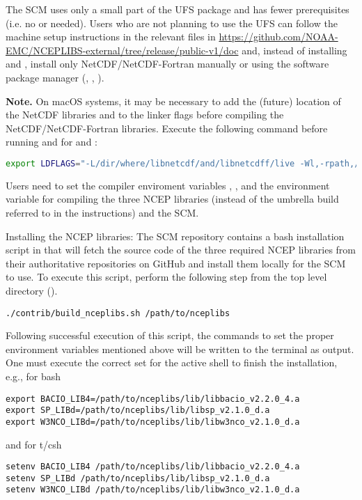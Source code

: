 The SCM uses only a small part of the UFS  package and has fewer prerequisites (i.e. no  or  needed). Users who are not planning to use the UFS can follow the machine setup instructions in the relevant  files in \url{https://github.com/NOAA-EMC/NCEPLIBS-external/tree/release/public-v1/doc} and, instead of installing  and , install only NetCDF/NetCDF-Fortran manually or using the software package manager (, , ).

\textbf{Note.} On macOS systems, it may be necessary to add the (future) location of the NetCDF libraries  and  to the  linker flags before compiling the NetCDF/NetCDF-Fortran libraries. Execute the following command before running  and  for  and :
\begin{lstlisting}[language=bash]
export LDFLAGS="-L/dir/where/libnetcdf/and/libnetcdff/live -Wl,-rpath,/dir/where/libnetcdf/and/libnetcdff/live"
\end{lstlisting}

Users need to set the compiler enviroment variables ,  ,  and the environment variable  for compiling the three NCEP libraries (instead of the  umbrella build referred to in the  instructions) and the SCM.

Installing the NCEP libraries: The SCM repository contains a bash installation script in  that will fetch the source code of the three required NCEP libraries from their authoritative repositories on GitHub and install them locally for the SCM to use. To execute this script, perform the following step from the top level directory ().
\begin{lstlisting}
./contrib/build_nceplibs.sh /path/to/nceplibs
\end{lstlisting}

Following successful execution of this script, the commands to set the proper environment variables mentioned above will be written to the terminal as output. One must execute the correct set for the active shell to finish the installation, e.g., for bash
\begin{lstlisting}
export BACIO_LIB4=/path/to/nceplibs/lib/libbacio_v2.2.0_4.a
export SP_LIBd=/path/to/nceplibs/lib/libsp_v2.1.0_d.a
export W3NCO_LIBd=/path/to/nceplibs/lib/libw3nco_v2.1.0_d.a
\end{lstlisting}
and for t/csh
\begin{lstlisting}
setenv BACIO_LIB4 /path/to/nceplibs/lib/libbacio_v2.2.0_4.a
setenv SP_LIBd /path/to/nceplibs/lib/libsp_v2.1.0_d.a
setenv W3NCO_LIBd /path/to/nceplibs/lib/libw3nco_v2.1.0_d.a
\end{lstlisting}

